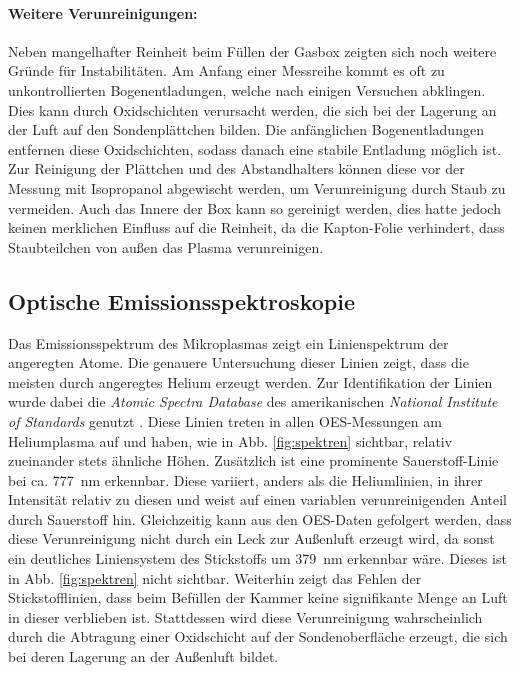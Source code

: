 \paragraph{Weitere Verunreinigungen:} Neben mangelhafter Reinheit beim Füllen der Gasbox zeigten sich noch weitere Gründe für Instabilitäten. Am Anfang einer Messreihe kommt es oft zu unkontrollierten Bogenentladungen, welche nach einigen Versuchen abklingen. Dies kann durch Oxidschichten verursacht werden, die sich bei der Lagerung an der Luft auf den Sondenplättchen bilden. Die anfänglichen Bogenentladungen entfernen diese Oxidschichten, sodass danach eine stabile Entladung möglich ist. Zur Reinigung der Plättchen und des Abstandhalters können diese vor der Messung mit Isopropanol abgewischt werden, um Verunreinigung durch Staub zu vermeiden. Auch das Innere der Box kann so gereinigt werden, dies hatte jedoch keinen merklichen Einfluss auf die Reinheit, da die Kapton-Folie verhindert, dass Staubteilchen von außen das Plasma verunreinigen.

\subsection{Optische Emissionsspektroskopie}

Das Emissionsspektrum des Mikroplasmas zeigt ein Linienspektrum der angeregten Atome. Die genauere Untersuchung dieser Linien zeigt, dass die meisten durch angeregtes Helium erzeugt werden. Zur Identifikation der Linien wurde dabei die \textit{Atomic Spectra Database} des amerikanischen \textit{National Institute of Standards} genutzt \cite{AtomicSpectraDatabase2009}. Diese Linien treten in allen OES-Messungen am Heliumplasma auf und haben, wie in Abb. \ref{fig:spektren} sichtbar, relativ zueinander stets ähnliche Höhen. Zusätzlich ist eine prominente Sauerstoff-Linie bei ca. \qty{777}{\nm} erkennbar. Diese variiert, anders als die Heliumlinien, in ihrer Intensität relativ zu diesen und weist auf einen variablen verunreinigenden Anteil durch Sauerstoff hin. Gleichzeitig kann aus den OES-Daten gefolgert werden, dass diese Verunreinigung nicht durch ein Leck zur Außenluft erzeugt wird, da sonst ein deutliches Liniensystem des Stickstoffs um \qty{379}{\nm} erkennbar wäre. Dieses ist in Abb. \ref{fig:spektren} nicht sichtbar. Weiterhin zeigt das Fehlen der Stickstofflinien, dass beim Befüllen der Kammer keine signifikante Menge an Luft in dieser verblieben ist. Stattdessen wird diese Verunreinigung wahrscheinlich durch die Abtragung einer Oxidschicht auf der Sondenoberfläche erzeugt, die sich bei deren Lagerung an der Außenluft bildet. 

